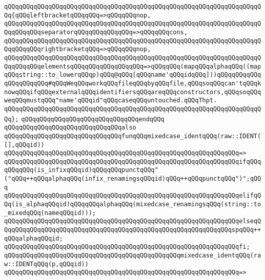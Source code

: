 \verb|qQQqqQQqqQQqqQQqqQQqqQQqqQQqqQQqqQQqqQQqqQQqqQQqqQQqqQQqqQQqqQQqqQQqqQQq{qQQqleftbracketqQQqqQQq=>qQQqqQQqnop,|\newline
\verb|qQQqqQQqqQQqqQQqqQQqqQQqqQQqqQQqqQQqqQQqqQQqqQQqqQQqqQQqqQQqqQQqqQQqqQQqqQQqqQQqseparatorqQQqqQQqqQQqqQQq=>qQQqqQQqcons,|\newline
\verb|qQQqqQQqqQQqqQQqqQQqqQQqqQQqqQQqqQQqqQQqqQQqqQQqqQQqqQQqqQQqqQQqqQQqqQQqqQQqqQQqrightbracketqQQq=>qQQqqQQqnop,|\newline
\verb|qQQqqQQqqQQqqQQqqQQqqQQqqQQqqQQqqQQqqQQqqQQqqQQqqQQqqQQqqQQqqQQqqQQqqQQqqQQqqQQqelementsqQQqqQQqqQQqqQQqqQQq=>qQQqqQQq(mapqQQqalphaqQQq((mapqQQqstring::to_lowerqQQqp)qQQq@qQQq[qQQqname'qQQqidqQQq]))qQQqqQQqqQQqqQQqqQQqqQQq#qQQqWeqQQqworkqQQqfileqQQqbyqQQqfile,qQQqsoqQQqcan'tqQQqknowqQQqifqQQqexternalqQQqidentifiersqQQqareqQQqconstructors,qQQqsoqQQqweqQQqmustqQQq"name'qQQqid"qQQqcaseqQQquntouched.qQQqThpt.|\newline
\verb|qQQqqQQqqQQqqQQqqQQqqQQqqQQqqQQqqQQqqQQqqQQqqQQqqQQqqQQqqQQqqQQqqQQqqQQq};|\newline
\verb|qQQqqQQqqQQqqQQqqQQqqQQqqQQqqQQqendqQQq|\newline
\newline
\verb|qQQqqQQqqQQqqQQqqQQqqQQqqQQqqQQqalso|\newline
\verb|qQQqqQQqqQQqqQQqqQQqqQQqqQQqqQQqfunqQQqmixedcase_identqQQq(raw::IDENT([],qQQqid))|\newline
\verb|qQQqqQQqqQQqqQQqqQQqqQQqqQQqqQQqqQQqqQQqqQQqqQQqqQQqqQQqqQQqqQQq=>|\newline
\verb|qQQqqQQqqQQqqQQqqQQqqQQqqQQqqQQqqQQqqQQqqQQqqQQqqQQqqQQqqQQqqQQqifqQQqqQQqqQQq(is_infixqQQqid)qQQqqQQqpunctqQQq"("qQQq++qQQqalphaqQQq(infix_renamingsqQQqid)qQQq++qQQqpunctqQQq")";qQQq|\newline
\verb|qQQqqQQqqQQqqQQqqQQqqQQqqQQqqQQqqQQqqQQqqQQqqQQqqQQqqQQqqQQqqQQqelifqQQq(is_alphaqQQqid)qQQqqQQqalphaqQQq(mixedcase_renamingsqQQq(string::to_mixedqQQq(nameqQQqid)));|\newline
\verb|qQQqqQQqqQQqqQQqqQQqqQQqqQQqqQQqqQQqqQQqqQQqqQQqqQQqqQQqqQQqqQQqelseqQQqqQQqqQQqqQQqqQQqqQQqqQQqqQQqqQQqqQQqqQQqqQQqqQQqqQQqqQQqqQQqspqQQq++qQQqalphaqQQqid;|\newline
\verb|qQQqqQQqqQQqqQQqqQQqqQQqqQQqqQQqqQQqqQQqqQQqqQQqqQQqqQQqqQQqqQQqfi;|\newline
\newline
\verb|qQQqqQQqqQQqqQQqqQQqqQQqqQQqqQQqqQQqqQQqqQQqqQQqmixedcase_identqQQq(raw::IDENTqQQq(p,qQQqid))|\newline
\verb|qQQqqQQqqQQqqQQqqQQqqQQqqQQqqQQqqQQqqQQqqQQqqQQqqQQqqQQqqQQqqQQq=>|\newline

